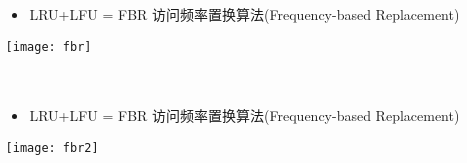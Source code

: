 \begin{frame}[plain]
	\frametitle{ }
	\begin{columns}
		\begin{column}{.0\textwidth}
			\centering
		\end{column}
		
		\begin{column}{1.0\textwidth}
			
			\begin{itemize}
				\item LRU+LFU = FBR 访问频率置换算法(Frequency-based Replacement)

			\end{itemize}
			
			\texttt{[image: fbr]}
		\end{column}
		
	\end{columns}
\end{frame}


\begin{frame}[plain]
	\frametitle{ }
	\begin{columns}
		\begin{column}{.0\textwidth}
			\centering
		\end{column}
		
		\begin{column}{1.0\textwidth}
			
			\begin{itemize}
				\item LRU+LFU = FBR 访问频率置换算法(Frequency-based Replacement)
				
			\end{itemize}
			
			\texttt{[image: fbr2]}
		\end{column}
		
		
	\end{columns}
\end{frame}



